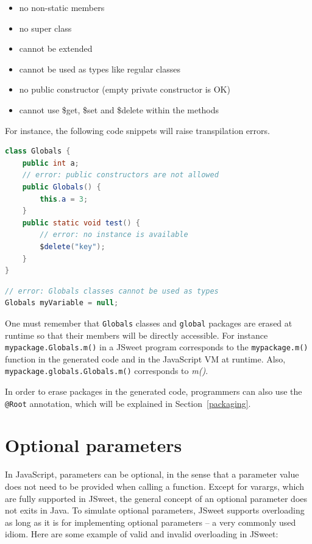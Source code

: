 \documentclass[a4paper]{report}
\begin{document}
\begin{itemize}
\item no non-static members
\item no super class
\item cannot be extended
\item cannot be used as types like regular classes
\item no public constructor (empty private constructor is OK)
\item cannot use \$get, \$set and \$delete within the methods
\end{itemize}

For instance, the following code snippets will raise transpilation errors.

\begin{lstlisting}[language=Java]
class Globals {
	public int a;
	// error: public constructors are not allowed
	public Globals() {
		this.a = 3;
	}
	public static void test() {
		// error: no instance is available
		$delete("key");
	}
}
\end{lstlisting}

\begin{lstlisting}[language=Java]
// error: Globals classes cannot be used as types
Globals myVariable = null;
\end{lstlisting}

One must remember that \texttt{Globals} classes and \texttt{global} packages are erased at runtime so that their members will be directly accessible. For instance \texttt{mypackage.Globals.m()} in a JSweet program corresponds to the \texttt{mypackage.m()} function in the generated code and in the JavaScript VM at runtime. Also, \texttt{mypackage.globals.Globals.m()} corresponds to \emph{m()}.

In order to erase packages in the generated code, programmers can also use the \texttt{@Root} annotation, which will be explained in Section~\ref{packaging}.

\section{Optional parameters} 
\label{optional-parameters}

In JavaScript, parameters can be optional, in the sense that a parameter value does not need to be provided when calling a function. Except for varargs, which are fully supported in JSweet, the general concept of an optional parameter does not exits in Java. To simulate optional parameters, JSweet supports overloading as long as it is for implementing optional parameters -- a very commonly used idiom. Here are some example of valid and invalid overloading in JSweet:
\end{document}
